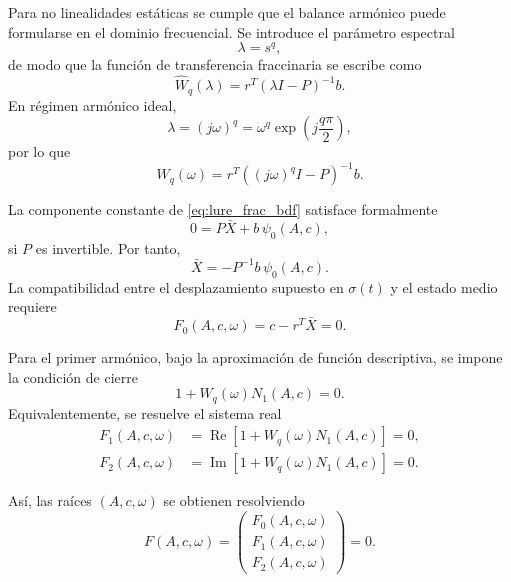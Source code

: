 \documentclass[journal]{IEEEtran}
\begin{document}
Para no linealidades est\'{a}ticas se cumple que el balance arm\'{o}nico puede formularse en el dominio frecuencial. Se introduce el par\'{a}metro espectral
\begin{equation}
\lambda=s^q,
\end{equation}
de modo que la funci\'{o}n de transferencia fraccinaria se escribe como
\begin{equation}
\widehat W_q(\lambda)
=
r^T(\lambda I-P)^{-1}b.
\label{eq:W_hat_frac_bdf}
\end{equation}
En r\'{e}gimen arm\'{o}nico ideal,
\begin{equation}
\lambda=(j\omega)^q
=
\omega^q\exp\left(j\frac{q\pi}{2}\right),
\label{eq:lambda_frac_frequency}
\end{equation}
por lo que
\begin{equation}
W_q(\omega)
=
r^T\left((j\omega)^q I-P\right)^{-1}b.
\label{eq:Wq_frequency_bdf}
\end{equation}

La componente constante de \eqref{eq:lure_frac_bdf} satisface formalmente
\begin{equation}
0=P\bar X+b\,\psi_0(A,c),
\end{equation}
si \(P\) es invertible. Por tanto,
\begin{equation}
\bar X=-P^{-1}b\,\psi_0(A,c).
\label{eq:xbar_bdf}
\end{equation}
La compatibilidad entre el desplazamiento supuesto en \(\sigma(t)\) y el estado
medio requiere
\begin{equation}
F_0(A,c,\omega)
=
c-r^T\bar X
=
0.
\label{eq:F0_bdf}
\end{equation}

Para el primer arm\'{o}nico, bajo la aproximaci\'{o}n de funci\'{o}n descriptiva, se impone
la condici\'{o}n de cierre
\begin{equation}
1+W_q(\omega)N_1(A,c)=0.
\label{eq:harmonic_balance_bdf}
\end{equation}
Equivalentemente, se resuelve el sistema real
\begin{align}
F_1(A,c,\omega)
&=
\operatorname{Re}\left[1+W_q(\omega)N_1(A,c)\right]
=
0,
\label{eq:F1_bdf}
\\
F_2(A,c,\omega)
&=
\operatorname{Im}\left[1+W_q(\omega)N_1(A,c)\right]
=
0.
\label{eq:F2_bdf}
\end{align}

As\'{i}, las ra\'{i}ces \((A,c,\omega)\) se obtienen resolviendo
\begin{equation}
F(A,c,\omega)
=
\begin{pmatrix}
F_0(A,c,\omega)\\
F_1(A,c,\omega)\\
F_2(A,c,\omega)
\end{pmatrix}
=
0.
\label{eq:bdf_root_system}
\end{equation}
\end{document}
